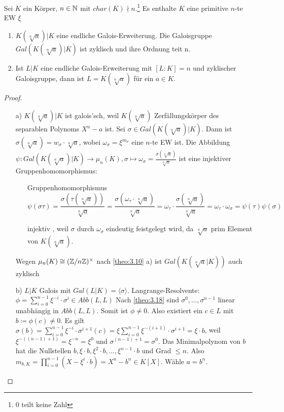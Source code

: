 \documentclass[../main.tex]{subfiles}
\begin{document}
\begin{theorem} \label{theo:3.22}
    Sei $K$ ein Körper, $n\in \mathbb{N}$ mit $char(K)\nmid n$.\footnote{0 teilt keine Zahl}
    Es enthalte $K$ eine primitive $n$-te EW $\xi$
    \begin{enumerate}[label=(\alph*)]
        \item $K(\sqrt[n]{a})|K$ eine endliche Galois-Erweiterung.
        Die Galoisgruppe $Gal(K(\sqrt[n]{a})|K)$ ist zyklisch und ihre Ordnung teit n.
        \item Ist $L|K$ eine endliche Galois-Erweiterung mit $[L:K] = n$ und zyklischer Galoisgruppe,
        dann ist $L=K(\sqrt[n]{a})$ für ein $a\in K$.
    \end{enumerate}
\end{theorem}
\begin{proof}$ $
    \begin{itemize}
        \item[a)] $K(\sqrt[n]{a})|K$ ist galois'sch, weil $K(\sqrt[n]{a})$ Zerfällungskörper des separablen Polynoms $X^n-a$ ist.
        Sei $\sigma\in Gal(K(\sqrt[n]{a})|K)$.
        Dann ist $\sigma(\sqrt[n]{a}) =w_\sigma \cdot \sqrt[n]{a}$, wobei $\omega_\sigma = \xi^{m_\sigma}$ eine $n$-te EW ist.
        Die Abbildung 
         $\psi: Gal(K(\sqrt[n]{a})|K)\rightarrow \mu_n(K), \sigma \mapsto \omega_\sigma = \frac{\sigma(\sqrt[n]{a})}{\sqrt[n]{a}}$ ist eine injektiver Gruppenhomomorphismus:
         \begin{itemize}[align=left]
             \item[Gruppenhomomorphismus]
             $$\psi(\sigma\tau) = \frac{\sigma(\tau(\sqrt[n]{a}))}{\sqrt[n]{a}} = \frac{\sigma(\omega_\tau \cdot \sqrt[n]{a})}{\sqrt[n]{a}} = \omega_\tau \cdot \frac{\sigma(\sqrt[n]{a})}{\sqrt[n]{a}} = \omega_\tau \cdot \omega_\sigma = \psi(\tau)\psi(\sigma)$$
             \item[injektiv]
             , weil $\sigma$ durch $\omega_\sigma$ eindeutig feistgelegt wird, da $\sqrt[n]{a}$ prim Element von $K(\sqrt[n]{a})$.
         \end{itemize}

        Wegen $\mu_n(K) \cong (\mathbb{Z}/n\mathbb{Z})^\times$ nach \ref{theo:3.10} a) ist $Gal(K(\sqrt[n]{a}|K))$ auch zyklisch
        
        \item[b)] $L|K$ Galois mit $Gal(L|K) = \langle\sigma\rangle$.
        Langrange-Resolvente: $\phi = \sum_{i=0}^{n-1} \xi^{-i}\cdot \sigma^i\in Abb(L,L)$
        Nach \ref{theo:3.18} sind $\sigma^0,...,\sigma^{n-1}$ linear unabhängig in $Abb(L,L)$.
        Somit ist $\phi\neq 0$. Also existiert ein $c\in L$ mit $b\coloneqq\phi(c) \neq 0$.
        Es gilt $\sigma(b) = \sum_{i=0}^{n-1} \xi^{-i}\cdot \sigma^{i+1}(c) =\xi \sum_{i=0}^{n-1} \xi^{-(i+1)}\cdot \sigma^{i+1} = \xi \cdot b$, weil $\xi^{-((n-1)+1)}=\xi^{-n}=\xi^{0}$ und $\sigma^{(n-1)+1} = \sigma^0$.
        Das Minimalpolynom von $b$ hat die Nullstellen $b, \xi\cdot b, \xi^2\cdot b,\dots,\xi^{n-1} \cdot b$ und Grad $\leq n$.
        Also $m_{b,K} = \prod_{i=0}^{n-1} (X-\xi^i\cdot b) = X^n-b^n\in K[X]$.
        Wähle $a=b^n$.
    \end{itemize}
\end{proof}
\end{document}
